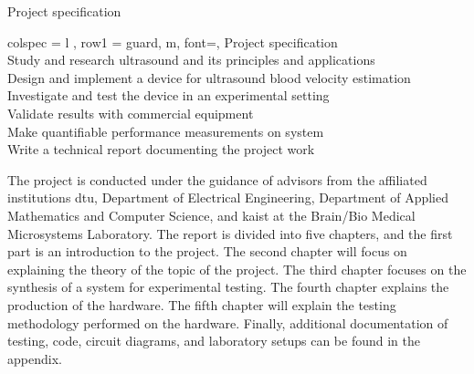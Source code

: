 \begin{table}[ht]
	\centering
	\caption{Project specification}
	\label{tab:specifications}
	\begin{tblr}[]{%
			colspec = {l
			},
			row{1} = {guard, m, font=\small\bfseries},
		}
		\toprule
		Project specification	\\
		\midrule
		Study and research ultrasound and its principles and applications	\\
		Design and implement a device for ultrasound blood velocity estimation	\\
		Investigate and test the device in an experimental setting		\\
		Validate results with commercial equipment 						\\
		Make quantifiable performance measurements on system			\\
		Write a technical report documenting the project work			\\ \bottomrule
	\end{tblr}
\end{table}

The project is conducted under the guidance of advisors from the affiliated institutions \Gls{dtu}, Department of Electrical Engineering, Department of Applied Mathematics and Computer Science, and \Gls{kaist} at the Brain/Bio Medical Microsystems Laboratory. The report is divided into five chapters, and the first part is an introduction to the project. The second chapter will focus on explaining the theory of the topic of the project. The third chapter focuses on the synthesis of a system for experimental testing. The fourth chapter explains the production of the hardware. The fifth chapter will explain the testing methodology performed on the hardware. Finally, additional documentation of testing, code, circuit diagrams, and laboratory setups can be found in the appendix.